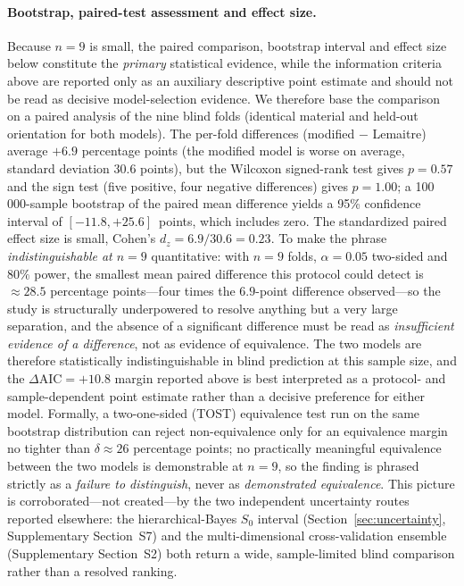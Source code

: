 \documentclass[twocolumn]{sagej}
\begin{document}
\paragraph{Bootstrap, paired-test assessment and effect size.} Because $n = 9$ is small, the paired comparison, bootstrap interval and effect size below constitute the \emph{primary} statistical evidence, while the information criteria above are reported only as an auxiliary descriptive point estimate and should not be read as decisive model-selection evidence. We therefore base the comparison on a paired analysis of the nine blind folds (identical material and held-out orientation for both models). The per-fold differences (modified $-$ Lemaitre) average $+6.9$ percentage points (the modified model is worse on average, standard deviation $30.6$ points), but the Wilcoxon signed-rank test gives $p = 0.57$ and the sign test (five positive, four negative differences) gives $p = 1.00$; a 100\,000-sample bootstrap of the paired mean difference yields a 95\% confidence interval of $[-11.8, +25.6]$~points, which includes zero. The standardized paired effect size is small, Cohen's $d_z = 6.9/30.6 = 0.23$. To make the phrase \emph{indistinguishable at $n=9$} quantitative: with $n=9$ folds, $\alpha=0.05$ two-sided and $80\%$ power, the smallest mean paired difference this protocol could detect is $\approx 28.5$ percentage points---four times the $6.9$-point difference observed---so the study is structurally underpowered to resolve anything but a very large separation, and the absence of a significant difference must be read as \emph{insufficient evidence of a difference}, not as evidence of equivalence. The two models are therefore statistically indistinguishable in blind prediction at this sample size, and the $\Delta\mathrm{AIC} = +10.8$ margin reported above is best interpreted as a protocol- and sample-dependent point estimate rather than a decisive preference for either model. Formally, a two-one-sided (TOST) equivalence test run on the same bootstrap distribution can reject non-equivalence only for an equivalence margin no tighter than $\delta \approx 26$ percentage points; no practically meaningful equivalence between the two models is demonstrable at $n=9$, so the finding is phrased strictly as a \emph{failure to distinguish}, never as \emph{demonstrated equivalence}. This picture is corroborated---not created---by the two independent uncertainty routes reported elsewhere: the hierarchical-Bayes $S_0$ interval (Section~\ref{sec:uncertainty}, Supplementary Section~S7) and the multi-dimensional cross-validation ensemble (Supplementary Section~S2) both return a wide, sample-limited blind comparison rather than a resolved ranking.
\end{document}
